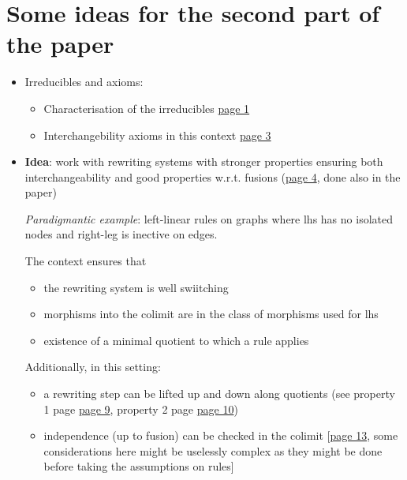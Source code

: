 \documentclass{article}
\newcounter{pdfpage}
\begin{document}
\hypertarget{start}{}

\section*{Some ideas for the second part of the paper}

\begin{itemize}

  \thispagestyle{empty}

\item Irreducibles and axioms:
  \begin{itemize}
  \item Characterisation of the irreducibles \hyperlink{pdfpage.1}{page 1}
  \item Interchangebility axioms in this context \hyperlink{pdfpage.3}{page 3}
  \end{itemize}    
  
\item \textbf{Idea}: work with rewriting systems with stronger
  properties ensuring both interchangeability and good properties
  w.r.t. fusions (\hyperlink{pdfpage.4}{page 4}, done also in the paper)

  \emph{Paradigmantic example}: left-linear rules on graphs where lhs
  has no isolated nodes and right-leg is inective on edges.

  The context ensures that 
  \begin{itemize}
  \item the rewriting system is well swiitching
  
  \item morphisms into the colimit are in the class of morphisms used for lhs
   
  \item existence of a minimal quotient to which a rule applies
  \end{itemize}

  Additionally, in this setting:
  \begin{itemize}
  \item a rewriting step can be lifted up and down along quotients (see property 1 page \hyperlink{pdfpage.9}{page 9}, property 2 page \hyperlink{pdfpage.10}{page 10})

  \item independence (up to fusion) can be checked in the colimit
    [\hyperlink{pdfpage.13}{page 13}, some considerations here might be uselessly
    complex as they might be done before taking the assumptions on
    rules]


\end{itemize}
\end{itemize}
\end{document}
